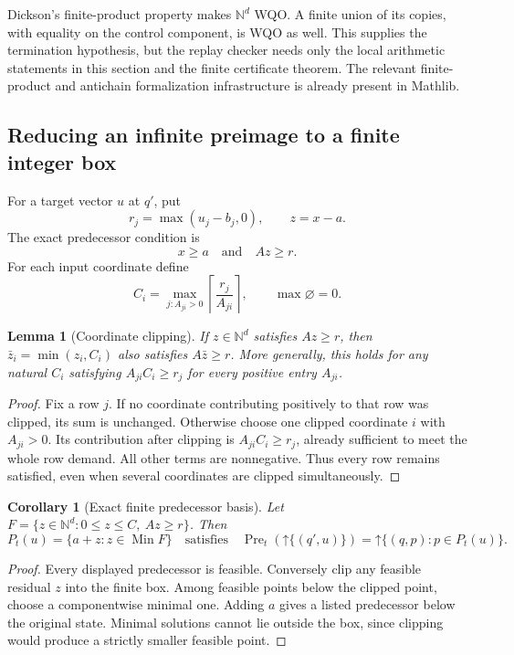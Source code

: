 \documentclass[11pt,a4paper]{article}
\newtheorem{lemma}[theorem]{Lemma}
\newtheorem{corollary}[theorem]{Corollary}
\theoremstyle{definition}
\newcommand{\N}{\mathbb N}
\newcommand{\Up}[1]{\mathord{\uparrow}#1}
\newcommand{\Pre}{\operatorname{Pre}}
\newcommand{\Min}{\operatorname{Min}}
\begin{document}
Dickson's finite-product property makes $\N^d$ WQO. A finite union of its
copies, with equality on the control component, is WQO as well. This supplies
the termination hypothesis, but the replay checker needs only the local
arithmetic statements in this section and the finite certificate theorem.
The relevant finite-product and antichain formalization infrastructure is
already present in Mathlib.\cite{mathlibwqo}

\subsection{Reducing an infinite preimage to a finite integer box}
For a target vector $u$ at $q'$, put
\begin{equation}
 r_j=\max(u_j-b_j,0),\qquad z=x-a.
\end{equation}
The exact predecessor condition is
\begin{equation}
 x\geq a\quad\text{and}\quad Az\geq r.
 \label{eq:preineq}
\end{equation}
For each input coordinate define
\begin{equation}
 C_i=\max_{j:A_{ji}>0}\left\lceil\frac{r_j}{A_{ji}}\right\rceil,
 \qquad \max\varnothing=0.
 \label{eq:cap}
\end{equation}

\begin{lemma}[Coordinate clipping]
\label{lem:clipping}
If $z\in\N^d$ satisfies $Az\geq r$, then
$\bar z_i=\min(z_i,C_i)$ also satisfies $A\bar z\geq r$.
More generally, this holds for any natural $C_i$ satisfying
$A_{ji}C_i\geq r_j$ for every positive entry $A_{ji}$.
\end{lemma}
\begin{proof}
Fix a row $j$. If no coordinate contributing positively to that row was
clipped, its sum is unchanged. Otherwise choose one clipped coordinate $i$
with $A_{ji}>0$. Its contribution after clipping is
$A_{ji}C_i\geq r_j$, already sufficient to meet the whole row demand. All
other terms are nonnegative. Thus every row remains satisfied, even when
several coordinates are clipped simultaneously.
\end{proof}

\begin{corollary}[Exact finite predecessor basis]
\label{cor:prebasis}
Let $F=\{z\in\N^d:0\leq z\leq C,\ Az\geq r\}$. Then
\begin{equation}
 P_t(u)=\{a+z:z\in\Min F\}
 \quad\text{satisfies}\quad
 \Pre_t(\Up{\{(q',u)\}})=\Up{\{(q,p):p\in P_t(u)\}}.
\end{equation}
\end{corollary}
\begin{proof}
Every displayed predecessor is feasible. Conversely clip any feasible
residual $z$ into the finite box. Among feasible points below the clipped
point, choose a componentwise minimal one. Adding $a$ gives a listed
predecessor below the original state. Minimal solutions cannot lie outside
the box, since clipping would produce a strictly smaller feasible point.
\end{proof}
\end{document}
